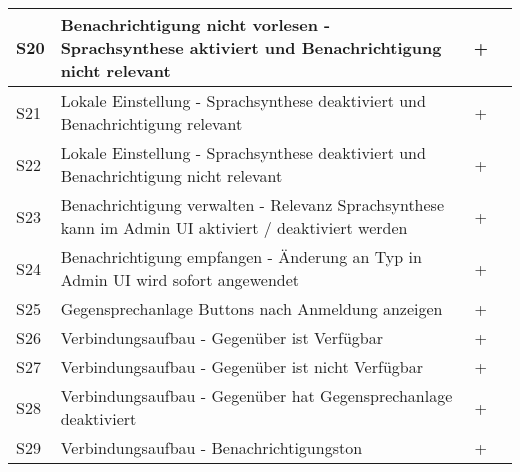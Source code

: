 \begin{table}[h]
\begin{tabular}{|l|p{11cm}|c|c|}
        \hline
        S20         & Benachrichtigung nicht vorlesen - Sprachsynthese aktiviert und Benachrichtigung nicht relevant & +\\
        \hline
        S21         & Lokale Einstellung - Sprachsynthese deaktiviert und Benachrichtigung relevant  & +\\
        \hline
        S22         & Lokale Einstellung - Sprachsynthese deaktiviert und Benachrichtigung nicht relevant  & +\\
        \hline
        S23         & Benachrichtigung verwalten - Relevanz Sprachsynthese kann im Admin UI aktiviert / deaktiviert werden  & +\\
        \hline
        S24         & Benachrichtigung empfangen - Änderung an Typ in Admin UI wird sofort angewendet   & +\\
        \hline
        S25         & Gegensprechanlage Buttons nach Anmeldung anzeigen & +\\
        \hline
        S26         & Verbindungsaufbau - Gegenüber ist Verfügbar & +\\
        \hline
        S27         & Verbindungsaufbau - Gegenüber ist nicht Verfügbar & +\\
        \hline
        S28         & Verbindungsaufbau - Gegenüber hat Gegensprechanlage deaktiviert & +\\
        \hline
        S29         & Verbindungsaufbau - Benachrichtigungston & +\\
        \hline
    \end{tabular}\label{tab:funktion_testplan_1}
\end{table}

\clearpage

